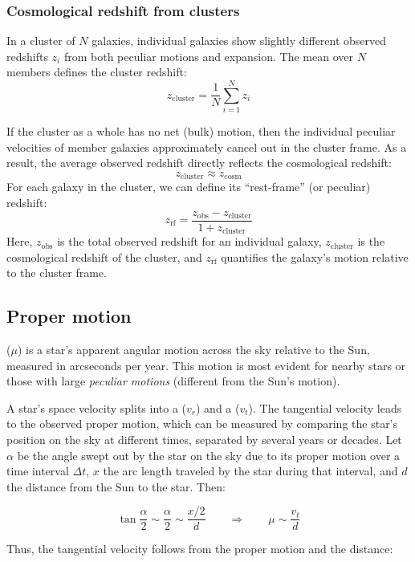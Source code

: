 \subsubsection{Cosmological redshift from clusters}

In a cluster of $N$ galaxies, individual galaxies show slightly different observed redshifts $z_i$ from both peculiar motions and expansion. The mean over $N$ members defines the cluster redshift:
$$
z_{\text{cluster}} = \frac{1}{N} \sum_{i=1}^N z_i
$$

If the cluster as a whole has no net (bulk) motion, then the individual peculiar velocities of member galaxies approximately cancel out in the cluster frame. As a result, the average observed redshift directly reflects the cosmological redshift:
$$
z_{\text{cluster}} \approx z_{\text{cosm}}
$$
For each galaxy in the cluster, we can define its ``rest-frame'' (or peculiar) redshift:
$$
z_{\mathrm{rf}} = \frac{z_{\mathrm{obs}} - z_{\text{cluster}}}{1 + z_{\text{cluster}}}
$$
Here, $z_{\mathrm{obs}}$ is the total observed redshift for an individual galaxy, $z_{\text{cluster}}$ is the cosmological redshift of the cluster, and $z_{\mathrm{rf}}$ quantifies the galaxy's motion relative to the cluster frame.

\subsection{Proper motion}

 ($\mu$) is a star's apparent angular motion across the sky relative to the Sun, measured in arcseconds per year. This motion is most evident for nearby stars or those with large \textit{peculiar motions} (different from the Sun's motion).

A star's space velocity splits into a  ($v_r$) and a  ($v_t$). The tangential velocity leads to the observed proper motion, which can be measured by comparing the star's position on the sky at different times, separated by several years or decades. Let $\alpha$ be the angle swept out by the star on the sky due to its proper motion over a time interval $\Delta t$, $x$ the arc length traveled by the star during that interval, and $d$ the distance from the Sun to the star. Then:

$$
\tan{\dfrac{\alpha}{2}} \sim \dfrac{\alpha}{2} \sim \dfrac {x/2}{d}
\qquad \Rightarrow \qquad 
\mu \sim \dfrac{v_t}{d}
$$

Thus, the tangential velocity follows from the proper motion and the distance:

